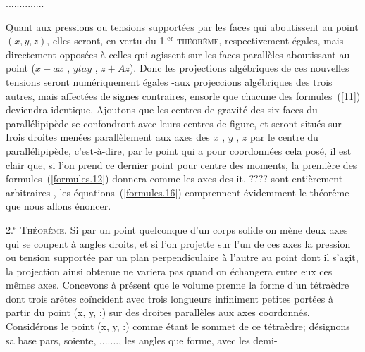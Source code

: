 \documentclass[11pt, twoside, leqno]{article}
\renewcommand{\eqref}[1]{(\ref{#1})}
\begin{document}
..............

Quant aux pressions ou tensions supportées par les faces qui aboutissent au point $(x,y,z)$, elles seront, en vertu du 1.${^{\text{er}}}$ \textsc{théorême}, respectivement égales, mais directement opposées à celles qui agissent sur les faces parallèles aboutissant au point ($x + ax$ , $y tay$ , $z + Az$). Donc les projections algébriques de ces nouvelles tensions seront numériquement égales -aux projeccions algébriques des trois autres, mais affectées de signes contraires, ensorle que chacune des formules~\eqref{11} deviendra identique. Ajoutons que les centres de gravité des six faces du parallélipipède se confondront avec leurs centres de figure, et seront situés sur Irois droites menées parallèlement aux axes des $x$ , $y$ , $z$ par le centre du parallélipipède, c'est\hbox{-}à\hbox{-}dire, par le point qui a pour coordonnées cela posé, il est clair que, si l'on prend ce dernier point pour centre des moments, la première des formules~\eqref{formules.12} donnera comme les axes des it, ???? sont entièrement arbitraires , les équations~\eqref{formules.16} comprennent évidemment le théorême que nous allons énoncer.

2.${^{\text{e}}}$ \textsc{Théorême}.
Si par un point quelconque d'un corps solide on mène deux axes qui se coupent à angles droits, et si l'on projette sur l'un de ces axes la pression ou tension supportée par un plan perpendiculaire à l'autre au point dont il s'agit, la projection ainsi obtenue ne variera pas quand on échangera entre eux ces mêmes axes. Concevons à présent que le volume prenne la forme d'un tétraèdre dont trois arêtes coïncident avec trois longueurs infiniment petites portées à partir du point (x, y, :) sur des droites parallèles aux axes coordonnés. Considérons le point (x, y, :) comme étant le sommet de ce tétraèdre; désignons sa base pars, soiente, ......., les angles que forme, avec les demi-
\end{document}
